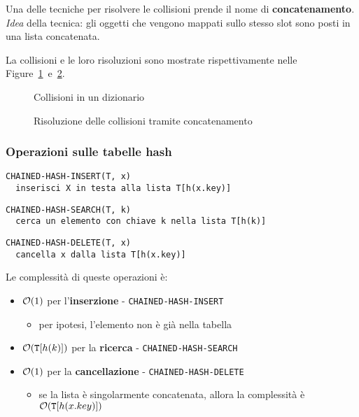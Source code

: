 \documentclass[italian, 10pt]{article}
\begin{document}
Una delle tecniche per risolvere le collisioni prende il nome di \textbf{concatenamento}.
\textit{Idea} della tecnica: gli oggetti che vengono mappati sullo stesso slot sono posti in una lista concatenata.

\bigskip
La collisioni e le loro risoluzioni sono mostrate rispettivamente nelle Figure~\ref{fig:collisioni-dizionario}~e~\ref{fig:risoluzione-collisioni-dizionario}.

\begin{figure}[htbp]
  \bigskip
  \centering
  \caption{Collisioni in un dizionario}
  \label{fig:collisioni-dizionario}
  \bigskip
\end{figure}

\begin{figure}[htbp]
  \bigskip
  \centering
  \caption{Risoluzione delle collisioni tramite concatenamento}
  \label{fig:risoluzione-collisioni-dizionario}
  \bigskip
\end{figure}

\subsubsection{Operazioni sulle tabelle hash}

\begin{lstlisting}[style=pseudocode, numbers=none]
CHAINED-HASH-INSERT(T, x)
  inserisci X in testa alla lista T[h(x.key)]
\end{lstlisting}
\begin{lstlisting}[style=pseudocode, numbers=none]
CHAINED-HASH-SEARCH(T, k)
  cerca un elemento con chiave k nella lista T[h(k)]
  \end{lstlisting}
\begin{lstlisting}[style=pseudocode, numbers=none]
CHAINED-HASH-DELETE(T, x)
  cancella x dalla lista T[h(x.key)]
    \end{lstlisting}

Le complessità di queste operazioni è:

\begin{itemize}
  \item \(\mathcal{O}(1)\) per l'\textbf{inserzione} - \texttt{CHAINED-HASH-INSERT}
        \begin{itemize}
          \item per ipotesi, l'elemento non è già nella tabella
        \end{itemize}
  \item \(\mathcal{O}(\texttt{T}[h(k)])\) per la \textbf{ricerca} - \texttt{CHAINED-HASH-SEARCH}
  \item \(\mathcal{O}(1)\) per la \textbf{cancellazione} - \texttt{CHAINED-HASH-DELETE}
        \begin{itemize}
          \item se la lista è singolarmente concatenata, allora la complessità è \(\mathcal{O}(\texttt{T}[h(x.key)])\)
        \end{itemize}
\end{itemize}
\end{document}
